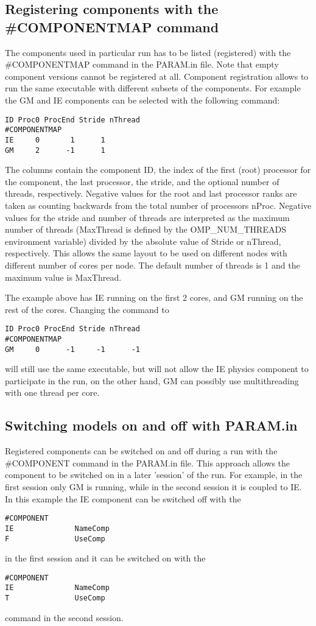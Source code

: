 \subsection{Registering components with the \#COMPONENTMAP command}

The components used in particular run has to be listed (registered)
with the \#COMPONENTMAP command in the PARAM.in file. 
Note that empty component versions cannot be registered at all.
Component registration allows to run the same executable with different 
subsets of the components. For example the GM and IE components 
can be selected with the following command:
\begin{verbatim}
ID Proc0 ProcEnd Stride nThread
#COMPONENTMAP
IE     0       1      1
GM     2      -1      1
\end{verbatim}
The columns contain the component ID, the index of the first (root)
processor for the component, the last processor, the stride, and the
optional number of threads, respectively. Negative values for the
root and last processor ranks are taken as counting backwards
from the total number of processors nProc. Negative values for the
stride and number of threads are interpreted as the maximum number of
threads (MaxThread is defined by the OMP\_NUM\_THREADS environment
variable) divided by the absolute value of Stride or nThread,
respectively.  This allows the same layout to be used on different
nodes with different number of cores per node.  The default number of
threads is 1 and the maximum value is MaxThread.

The example above has IE running on the first 2 cores, and GM
running on the rest of the cores. Changing the command to
\begin{verbatim}
ID Proc0 ProcEnd Stride nThread
#COMPONENTMAP
GM     0      -1     -1      -1
\end{verbatim}
will still use the same executable, but will not allow the IE 
physics component to participate in the run, on the other hand,
GM can possibly use multithreading with one thread per core.

\subsection{Switching models on and off with PARAM.in}

Registered components can be switched on and off during a run
with the \#COMPONENT command in the PARAM.in file. 
This approach allows the component to be switched on in a later 
'session' of the run. For example, in the first session only GM 
is running, while in the second session it is coupled to IE. 
In this example the IE component can be switched off with the
\begin{verbatim}
#COMPONENT
IE              NameComp
F               UseComp
\end{verbatim}
in the first session and it can be switched on with the
\begin{verbatim}
#COMPONENT
IE              NameComp
T               UseComp
\end{verbatim}
command in the second session.

